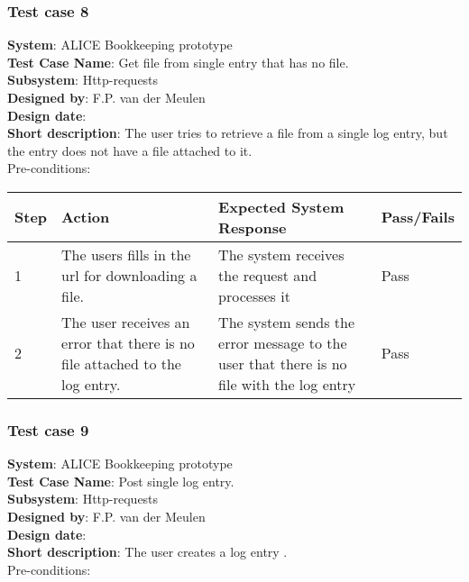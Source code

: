 \subsubsection{Test case 8}
\textbf{System}:  ALICE Bookkeeping prototype \\
\textbf{Test Case Name}:  Get file from single entry that has no file. \\
\textbf{Subsystem}:  Http-requests \\
\textbf{Designed by}:  F.P. van der Meulen\\
\textbf{Design date}:  \\
\textbf{Short description}: The user tries to retrieve a file from a single log entry, but the entry does not have a file attached to it. \\

Pre-conditions: \\

\begin{longtable}{ | p{0.8cm} | p{4.5cm} | p{6cm} | p{1.5cm} |}
\hline
Step & Action & Expected System Response & Pass/Fails  \\ \hline
1 & The users fills in the url for downloading a file. & The system receives the request and processes it & Pass \\ \hline
2 & The user receives an error that there is no file attached to the log entry. & The system sends the error message to the user that there is no file with the log entry & Pass
\end{longtable}

\subsubsection{Test case 9}
\textbf{System}:  ALICE Bookkeeping prototype \\
\textbf{Test Case Name}:  Post single log entry. \\
\textbf{Subsystem}:  Http-requests \\
\textbf{Designed by}:  F.P. van der Meulen\\
\textbf{Design date}:  \\
\textbf{Short description}: The user creates a log entry . \\

Pre-conditions: \\

